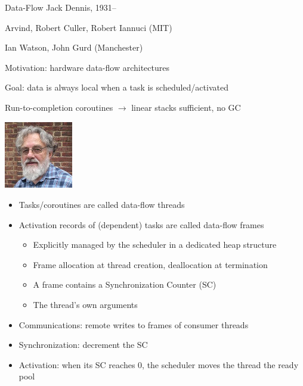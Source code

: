 \documentclass[xcolor=dvipsnames,9pt,mathserif]{beamer}
\renewcommand{\emph}[1]{\alert{#1}}
\begin{document}
\begin{frame}{Data-Flow}
  Jack Dennis, 1931--

  Arvind, Robert Culler, Robert Iannuci (MIT)

  \medskip
  Ian Watson, John Gurd (Manchester)

  Motivation: hardware data-flow architectures

  \bigskip
  \emph{Goal: data is always local when a task is scheduled/activated}

  \emph{Run-to-completion coroutines $\to$ linear stacks sufficient,
    no GC}

  \vskip-2cm
  \hfill\includegraphics[width=3cm]{dennis}

  \bigskip
  \begin{itemize}
  \item Tasks/coroutines are called \emph{data-flow threads}
  \item Activation records of (dependent) tasks are called
    \emph{data-flow frames}
    \begin{itemize}
    \item Explicitly managed by the scheduler in a dedicated heap structure
    \item Frame allocation at thread creation, deallocation at termination
    \item A frame contains a \emph{Synchronization Counter} (SC)
    \item The thread's own arguments
    \end{itemize}
  \item Communications: remote writes to frames of consumer threads
  \item Synchronization: decrement the SC
  \item Activation: when its SC reaches 0, the scheduler moves the
    thread the ready pool
  \end{itemize}
\end{frame}
\end{document}
